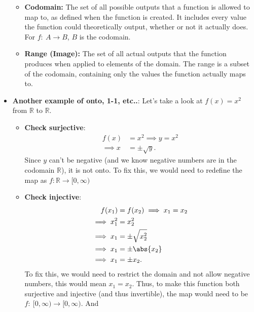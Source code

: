 \documentclass{report}
\begin{document}
\begin{itemize}
                \begin{itemize}
                    \item \textbf{Codomain:} The set of all possible outputs that a function is allowed to map to, as defined when the function is created. It includes every value the function could theoretically output, whether or not it actually does. For $f:\ A\to B$, $B$ is the codomain.
                    \item \textbf{Range (Image):} The set of all actual outputs that the function produces when applied to elements of the domain. The range is a subset of the codomain, containing only the values the function actually maps to.
                \end{itemize}
            \item \textbf{Another example of onto, 1-1, etc..}: Let's take a look at $f(x) = x^{2}$ from $\mathbb{R}$ to $\mathbb{R}$.
                \begin{itemize}
                    \item \textbf{Check surjective}:
                        \begin{align*}
                            f(x) &= x^{2} \implies y =x^{2} \\
                            \implies x &= \pm \sqrt{y} 
                        .\end{align*}
                        Since $y$ can't be negative (and we know negative numbers are in the codomain $\mathbb{R}$), it is not onto. To fix this, we would need to redefine the map as $f: \mathbb{R} \to [0,\infty) $
                    \item \textbf{Check injective}:
                        \begin{align*}
                            f(x_1) &= f(x_2) \implies x_1 = x_2  \\
                            \implies  x_{1}^{2} &= x_{2}^{2}  \\
                            \implies x_1 & = \pm \sqrt{x_{2}^{2}} \\
                            \implies x_1 &= \pm \abs{x_2} \\
                            \implies x_1 &= \pm x_2
                        .\end{align*}
                        To fix this, we would need to restrict the domain and not allow negative numbers, this would mean $x_1 = x_2$. Thus, to make this function both surjective and injective (and thus invertible), the map would need to be $f:\ [0,\infty) \to [0,\infty)$. And

\end{itemize}
\end{itemize}
\end{document}
